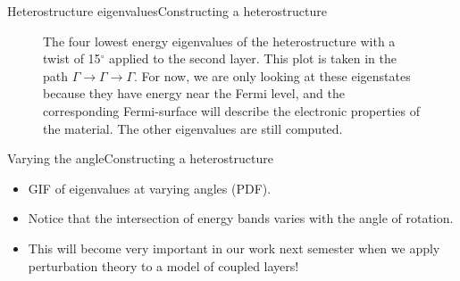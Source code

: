 \documentclass[9pt]{beamer}
\begin{document}
\begin{frame}{Heterostructure eigenvalues}{Constructing a heterostructure}
  \begin{figure}
    \centering
    \caption{The four lowest energy eigenvalues of the heterostructure with a twist of 15$^\circ$ applied to the second layer. This plot is taken in the path $\Gamma \rightarrow \Gamma \rightarrow \Gamma$. For now, we are only looking at these eigenstates because they have energy near the Fermi level, and the corresponding Fermi-surface will describe the electronic properties of the material. The other eigenvalues are still computed.}
  \end{figure}
\end{frame}

\begin{frame}{Varying the angle}{Constructing a heterostructure}
  \begin{itemize}
    \item GIF of eigenvalues at varying angles (PDF).
    \item Notice that the intersection of energy bands varies with the angle of rotation.
    \item This will become very important in our work next semester when we apply perturbation theory to a model of coupled layers!
  \end{itemize}
\end{frame}
\end{document}
